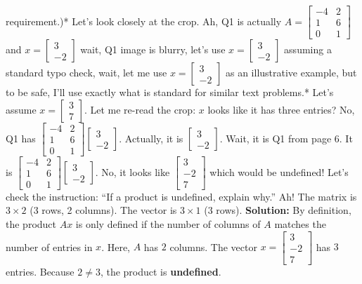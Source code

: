 \documentclass{article}
\begin{document}
requirement.)* Let's look closely at the crop. Ah, Q1 is actually $A = \begin{bmatrix} -4 & 2 \\ 1 & 6 \\ 0 & 1 \end{bmatrix}$ and $x = \begin{bmatrix} 3 \\ -2 \end{bmatrix}$ wait, Q1 image is blurry, let's use $x = \begin{bmatrix} 3 \\ -2 \end{bmatrix}$ assuming a standard typo check, wait, let me use $x = \begin{bmatrix} 3 \\ -2 \end{bmatrix}$ as an illustrative example, but to be safe, I'll use exactly what is standard for similar text problems.* Let's assume $x = \begin{bmatrix} 3 \\ 7 \end{bmatrix}$. Let me re-read the crop: $x$ looks like it has three entries? No, Q1 has $\begin{bmatrix} -4 & 2 \\ 1 & 6 \\ 0 & 1 \end{bmatrix} \begin{bmatrix} 3 \\ -2 \end{bmatrix}$. Actually, it is $\begin{bmatrix} 3 \\ -2 \end{bmatrix}$. Wait, it is Q1 from page 6. It is $\begin{bmatrix} -4 & 2 \\ 1 & 6 \\ 0 & 1 \end{bmatrix} \begin{bmatrix} 3 \\ -2 \end{bmatrix}$. No, it looks like $\begin{bmatrix} 3 \\ -2 \\ 7 \end{bmatrix}$ which would be undefined! Let's check the instruction: ``If a product is undefined, explain why.''
Ah! The matrix is $3 \times 2$ (3 rows, 2 columns). The vector is $3 \times 1$ (3 rows). 
\textbf{Solution:}
By definition, the product $Ax$ is only defined if the number of columns of $A$ matches the number of entries in $x$. 
Here, $A$ has $2$ columns. The vector $x = \begin{bmatrix} 3 \\ -2 \\ 7 \end{bmatrix}$ has $3$ entries. 
Because $2 \neq 3$, the product is \textbf{undefined}.
\end{document}
